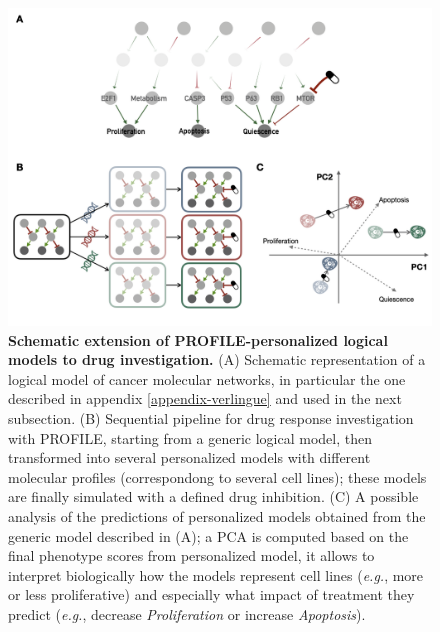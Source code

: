 \documentclass[a4paper,12pt,twoside,onecolumn,openright,final,oldfontcommands]{memoir}
\begin{document}
\begin{figure}

{\centering \includegraphics[width=0.9\linewidth]{fig/PROFILE-drug} 

}

\caption[Schematic extension of PROFILE-personalized logical models to drug investigation]{\textbf{Schematic extension of
PROFILE-personalized logical models to drug investigation.} (A)
Schematic representation of a logical model of cancer molecular
networks, in particular the one described in appendix
\ref{appendix-verlingue} and used in the next subsection. (B) Sequential
pipeline for drug response investigation with PROFILE, starting from a
generic logical model, then transformed into several personalized models
with different molecular profiles (correspondong to several cell lines);
these models are finally simulated with a defined drug inhibition. (C) A
possible analysis of the predictions of personalized models obtained
from the generic model described in (A); a PCA is computed based on the
final phenotype scores from personalized model, it allows to interpret
biologically how the models represent cell lines (\emph{e.g.}, more or
less proliferative) and especially what impact of treatment they predict
(\emph{e.g.}, decrease \emph{Proliferation} or increase
\emph{Apoptosis}).}\label{fig:PROFILE-drug}
\end{figure}
\end{document}

